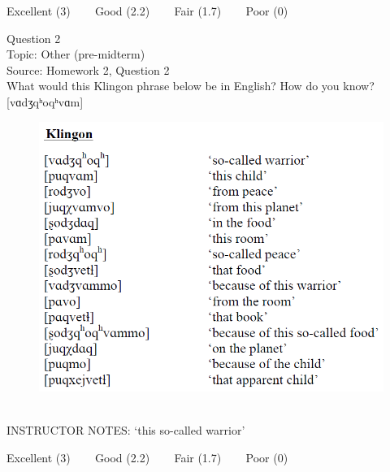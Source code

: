 \documentclass[12pt]{article}
\begin{document}
\vfill
Excellent (3) ~~~ Good (2.2) ~~~ Fair (1.7) ~~~ Poor (0)
\newpage

{\large Question 2}\\

Topic: Other (pre-midterm)\\
Source: Homework 2, Question 2\\

What would this Klingon phrase below be in English? How do you know?\\

{[vɑdʒqʰoqʰvɑm]}

\begin{figure}[H]
\includegraphics{../images/klingon.png}
\end{figure}

~\\
INSTRUCTOR NOTES: ‘this so-called warrior’


\vfill
Excellent (3) ~~~ Good (2.2) ~~~ Fair (1.7) ~~~ Poor (0)
\newpage

\begin{center}
\textbf{{\color{red}{\HUGE END OF EXAM}}}\\

\end{center}
\newpage

\begin{center}
\textbf{{\color{blue}{\HUGE START OF EXAM\\}}}

\textbf{{\color{blue}{\HUGE Student ID: 45517\\}}}

\textbf{{\color{blue}{\HUGE 9:20\\}}}

\end{center}
\newpage
\end{document}
